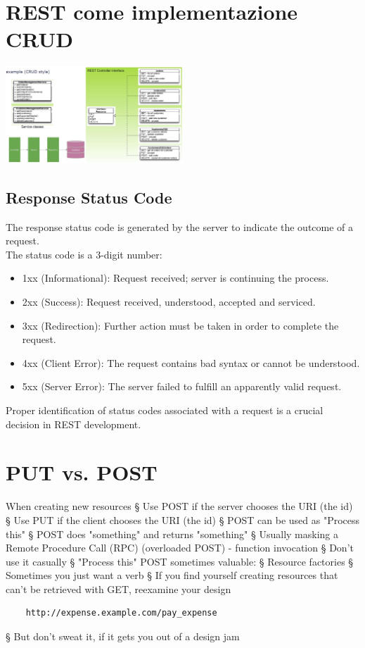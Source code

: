 \section{REST come implementazione CRUD}
\begin{center}
    \includegraphics[width=0.5\textwidth]{img/REST5.jpg}
\end{center}

\subsection{Response Status Code}
The response status code is generated by the server to indicate the outcome of a request.
\\The status code is a 3-digit number:
\begin{itemize}
    \item 1xx (Informational): Request received; server is continuing the process.
    \item 2xx (Success): Request received, understood, accepted and serviced.
    \item 3xx (Redirection): Further action must be taken in order to complete the request.
    \item 4xx (Client Error): The request contains bad syntax or cannot be understood.
    \item 5xx (Server Error): The server failed to fulfill an apparently valid request.
\end{itemize}
Proper identification of status codes associated with a request is a crucial decision in REST development.

\section{PUT vs. POST}
When creating new resources
§ Use POST if the server chooses the URI (the id)
§ Use PUT if the client chooses the URI (the id)
§ POST can be used as "Process this"
§ POST does "something" and returns "something"
§ Usually masking a Remote Procedure Call (RPC) (overloaded POST) - function invocation
§ Don't use it casually
§ "Process this" POST sometimes valuable:
§ Resource factories
§ Sometimes you just want a verb
§ If you find yourself creating resources that can't be retrieved with GET, reexamine your design
\begin{verbatim}
    http://expense.example.com/pay_expense
\end{verbatim}
§ But don't sweat it, if it gets you out of a design jam

